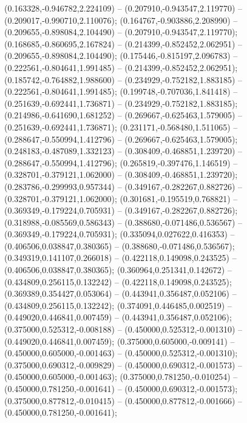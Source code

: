  (0.163328,-0.946782,2.224109) -- (0.207910,-0.943547,2.119770) -- (0.209017,-0.990710,2.110076);
 (0.164767,-0.903886,2.208990) -- (0.209655,-0.898084,2.104490) -- (0.207910,-0.943547,2.119770);
 (0.168685,-0.860695,2.167824) -- (0.214399,-0.852452,2.062951) -- (0.209655,-0.898084,2.104490);
 (0.175446,-0.815197,2.096783) -- (0.222561,-0.804641,1.991485) -- (0.214399,-0.852452,2.062951);
 (0.185742,-0.764882,1.988600) -- (0.234929,-0.752182,1.883185) -- (0.222561,-0.804641,1.991485);
 (0.199748,-0.707036,1.841418) -- (0.251639,-0.692441,1.736871) -- (0.234929,-0.752182,1.883185);
 (0.214986,-0.641690,1.681252) -- (0.269667,-0.625463,1.579005) -- (0.251639,-0.692441,1.736871);
 (0.231171,-0.568480,1.511065) -- (0.288647,-0.550994,1.412796) -- (0.269667,-0.625463,1.579005);
 (0.248183,-0.487089,1.332123) -- (0.308409,-0.468851,1.239720) -- (0.288647,-0.550994,1.412796);
 (0.265819,-0.397476,1.146519) -- (0.328701,-0.379121,1.062000) -- (0.308409,-0.468851,1.239720);
 (0.283786,-0.299993,0.957344) -- (0.349167,-0.282267,0.882726) -- (0.328701,-0.379121,1.062000);
 (0.301681,-0.195519,0.768821) -- (0.369349,-0.179224,0.705931) -- (0.349167,-0.282267,0.882726);
 (0.318988,-0.085569,0.586343) -- (0.388680,-0.071486,0.536567) -- (0.369349,-0.179224,0.705931);
 (0.335094,0.027622,0.416353) -- (0.406506,0.038847,0.380365) -- (0.388680,-0.071486,0.536567);
 (0.349319,0.141107,0.266018) -- (0.422118,0.149098,0.243525) -- (0.406506,0.038847,0.380365);
 (0.360964,0.251341,0.142672) -- (0.434809,0.256115,0.132242) -- (0.422118,0.149098,0.243525);
 (0.369389,0.354427,0.053064) -- (0.443941,0.356487,0.052106) -- (0.434809,0.256115,0.132242);
 (0.374091,0.446485,0.002519) -- (0.449020,0.446841,0.007459) -- (0.443941,0.356487,0.052106);
 (0.375000,0.525312,-0.008188) -- (0.450000,0.525312,-0.001310) -- (0.449020,0.446841,0.007459);
 (0.375000,0.605000,-0.009141) -- (0.450000,0.605000,-0.001463) -- (0.450000,0.525312,-0.001310);
 (0.375000,0.690312,-0.009829) -- (0.450000,0.690312,-0.001573) -- (0.450000,0.605000,-0.001463);
 (0.375000,0.781250,-0.010254) -- (0.450000,0.781250,-0.001641) -- (0.450000,0.690312,-0.001573);
 (0.375000,0.877812,-0.010415) -- (0.450000,0.877812,-0.001666) -- (0.450000,0.781250,-0.001641);
